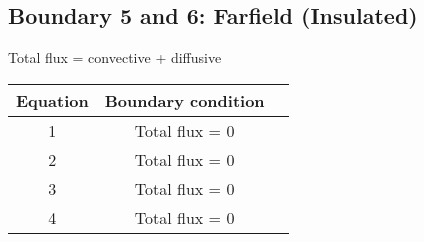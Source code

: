 \documentclass[12pt, a4paper]{report}
\begin{document}
\subsection{Boundary 5 and 6: Farfield (Insulated)}
Total flux = convective + diffusive

\begin{table}[!h]
    \centering\begin{tabular}{|c|c|c}
        \hline
        Equation & Boundary condition\\ \hline
        1 & Total flux = 0  \\ \hline
        2 & Total flux = 0\\ \hline
        3 & Total flux = 0 \\ \hline
        4 & Total flux = 0 \\ \hline
    \end{tabular}

\end{table}
\end{document}
